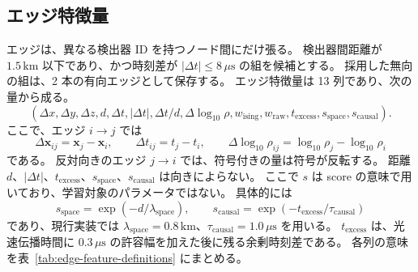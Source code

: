 \documentclass[lualatex,paper=a4,fontsize=9pt]{jlreq}
\begin{document}
\subsection{エッジ特徴量}

エッジは、異なる検出器 ID を持つノード間にだけ張る。
検出器間距離が $1.5\,\mathrm{km}$ 以下であり、かつ時刻差が $|\Delta t|\le 8\,\mu\mathrm{s}$ の組を候補とする。
採用した無向の組は、2 本の有向エッジとして保存する。
エッジ特徴量は 13 列であり、次の量から成る。
\[
(\Delta x,\Delta y,\Delta z,d,\Delta t,|\Delta t|,\Delta t/d,
\Delta\log_{10}\rho,
w_{\mathrm{ising}},w_{\mathrm{raw}},t_{\mathrm{excess}},s_{\mathrm{space}},s_{\mathrm{causal}}).
\]
ここで、エッジ $i\rightarrow j$ では
\[
  \Delta \mathbf{x}_{ij}=\mathbf{x}_j-\mathbf{x}_i,\qquad
  \Delta t_{ij}=t_j-t_i,\qquad
  \Delta\log_{10}\rho_{ij}=\log_{10}\rho_j-\log_{10}\rho_i
\]
である。
反対向きのエッジ $j\rightarrow i$ では、符号付きの量は符号が反転する。
距離 $d$、$|\Delta t|$、$t_{\mathrm{excess}}$、$s_{\mathrm{space}}$、$s_{\mathrm{causal}}$ は向きによらない。
ここで $s$ は score の意味で用いており、学習対象のパラメータではない。
具体的には
\[
  s_{\mathrm{space}}=\exp(-d/\lambda_{\mathrm{space}}),\qquad
  s_{\mathrm{causal}}=\exp(-t_{\mathrm{excess}}/\tau_{\mathrm{causal}})
\]
であり、現行実装では $\lambda_{\mathrm{space}}=0.8\,\mathrm{km}$、$\tau_{\mathrm{causal}}=1.0\,\mu\mathrm{s}$ を用いる。
$t_{\mathrm{excess}}$ は、光速伝播時間に $0.3\,\mu\mathrm{s}$ の許容幅を加えた後に残る余剰時刻差である。
各列の意味を表~\ref{tab:edge-feature-definitions} にまとめる。
\end{document}
